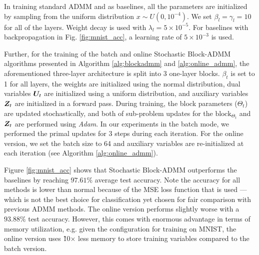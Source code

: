In training standard ADMM and \cite{taylor2016training} as baselines, all the parameters are initialized by sampling from the uniform distribution $x \sim {U}(0, 10^{-4})$.%
We set $\beta_l = \gamma_l = 10$ for all of the layers. 
Weight decay is used with $\lambda_l = 5 \times 10^{-5}$. %
For baselines with backpropagation in Fig. \ref{fig:mnist_acc}, a  learning rate of $5 \times 10^{-3}$ is used. 
 
 
Further, for the training of the batch and online Stochastic Block-ADMM algorithms presented in Algorithm \ref{alg:blockadmm} and \ref{alg:online_admm}, the aforementioned three-layer architecture is split into 3 one-layer blocks. $\beta_t$ is set to 1 for all layers, the weights are initialized using the normal distribution, dual variables ${\bm{U}}_t$ are initialized using a uniform distribution, and auxiliary variables ${\bm{Z}}_t$ are initialized in a forward pass. During training, the block parameters ($\Theta_t$) are updated stochastically, and both of sub-problem updates for the $\text{block}_{\Theta_t}$ and ${\bm{Z}}_t$ are performed using \textit{Adam}. In our experiments in the batch mode, we performed the primal updates for $3$ steps during each iteration. For the online version, we set the batch size to 64 and auxiliary variables are re-initialized at each iteration (see Algorithm \ref{alg:online_admm}). 

Figure \ref{fig:mnist_acc} shows that Stochastic Block-ADMM outperforms the baselines by reaching $97.61 \%$ average test accuracy. Note the accuracy for all methods is lower than normal because of the MSE loss function that is used --- which is not the best choice for classification yet chosen for fair comparison with previous ADMM methods. The online version performs slightly worse with a $93.88 \%$ test accuracy. However, this comes with enormous advantage in terms of memory utilization, e.g. given the configuration for training on MNIST, the online version uses \~ 10$\times$ less memory to store training variables compared to the batch version.


